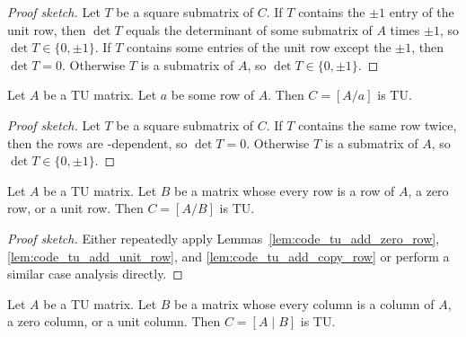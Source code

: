 \begin{proof}[Proof sketch]
  Let $T$ be a square submatrix of $C$. If $T$ contains the $\pm 1$ entry of the unit row, then $\det T$ equals the determinant of some submatrix of $A$ times $\pm 1$, so $\det T \in \{0, \pm 1\}$. If $T$ contains some entries of the unit row except the $\pm 1$, then $\det T = 0$. Otherwise $T$ is a submatrix of $A$, so $\det T \in \{0, \pm 1\}$.
\end{proof}

\begin{lemma}
  \label{lem:code_tu_add_copy_row}
  Let $A$ be a TU matrix. Let $a$ be some row of $A$. Then $C = \left[ A / a \right]$ is TU.
\end{lemma}

\begin{proof}[Proof sketch]
  Let $T$ be a square submatrix of $C$. If $T$ contains the same row twice, then the rows are \GFtwo-dependent, so $\det T = 0$. Otherwise $T$ is a submatrix of $A$, so $\det T \in \{0, \pm 1\}$.
\end{proof}

\begin{lemma}
  \label{lem:code_tu_add_ok_rows}
  Let $A$ be a TU matrix. Let $B$ be a matrix whose every row is a row of $A$, a zero row, or a unit row. Then $C = \left[ A / B \right]$ is TU.
\end{lemma}

\begin{proof}[Proof sketch]
  Either repeatedly apply Lemmas~\ref{lem:code_tu_add_zero_row}, \ref{lem:code_tu_add_unit_row}, and \ref{lem:code_tu_add_copy_row}
  or perform a similar case analysis directly.
\end{proof}

\begin{corollary}
  \label{cor:code_tu_add_ok_cols}
  Let $A$ be a TU matrix. Let $B$ be a matrix whose every column is a column of $A$, a zero column, or a unit column. Then $C = \left[ A \mid B \right]$ is TU.
\end{corollary}

